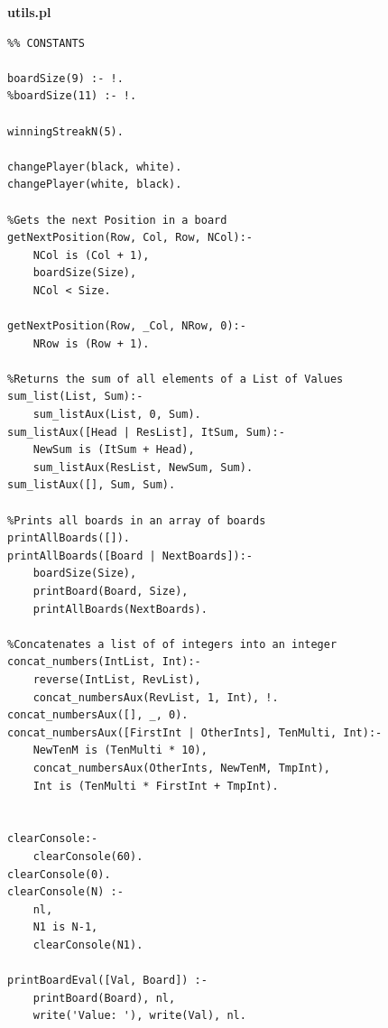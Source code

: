 \documentclass[a4paper]{article}
\begin{document}
\huge\textbf{utils.pl}
\begin{lstlisting}
%% CONSTANTS

boardSize(9) :- !.
%boardSize(11) :- !.

winningStreakN(5).

changePlayer(black, white).
changePlayer(white, black).

%Gets the next Position in a board
getNextPosition(Row, Col, Row, NCol):-
	NCol is (Col + 1),
	boardSize(Size),
	NCol < Size.

getNextPosition(Row, _Col, NRow, 0):-
	NRow is (Row + 1).

%Returns the sum of all elements of a List of Values
sum_list(List, Sum):-
	sum_listAux(List, 0, Sum).
sum_listAux([Head | ResList], ItSum, Sum):-
	NewSum is (ItSum + Head),
	sum_listAux(ResList, NewSum, Sum).
sum_listAux([], Sum, Sum).

%Prints all boards in an array of boards
printAllBoards([]).
printAllBoards([Board | NextBoards]):-
	boardSize(Size),
	printBoard(Board, Size),
	printAllBoards(NextBoards).

%Concatenates a list of of integers into an integer
concat_numbers(IntList, Int):-
	reverse(IntList, RevList),
	concat_numbersAux(RevList, 1, Int), !.
concat_numbersAux([], _, 0).
concat_numbersAux([FirstInt | OtherInts], TenMulti, Int):-
	NewTenM is (TenMulti * 10),
	concat_numbersAux(OtherInts, NewTenM, TmpInt),
	Int is (TenMulti * FirstInt + TmpInt).


clearConsole:-
	clearConsole(60).
clearConsole(0).
clearConsole(N) :-
	nl, 
	N1 is N-1, 
	clearConsole(N1).

printBoardEval([Val, Board]) :-
	printBoard(Board), nl,
	write('Value: '), write(Val), nl.
\end{lstlisting}
\newpage
\end{document}
